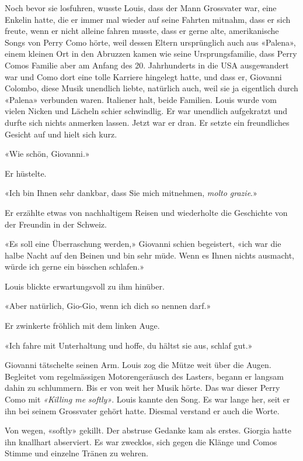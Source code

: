Noch bevor sie losfuhren, wusste Louis, dass der Mann Grossvater war,
eine Enkelin hatte, die er immer mal wieder auf seine Fahrten mitnahm,
dass er sich freute, wenn er nicht alleine fahren musste, dass er gerne
alte, amerikanische Songs von Perry Como hörte, weil dessen Eltern
ursprünglich auch aus «Palena», einem kleinen Ort in den Abruzzen kamen wie
seine Ursprungsfamilie, dass Perry Comos Familie aber am Anfang des 20.
Jahrhunderts in die USA ausgewandert war und Como dort eine tolle
Karriere hingelegt hatte, und dass er, Giovanni Colombo, diese Musik
unendlich liebte, natürlich auch, weil sie ja eigentlich durch «Palena»
verbunden waren. Italiener halt, beide Familien.
Louis wurde vom vielen Nicken und Lächeln schier schwindlig. Er war
unendlich aufgekratzt und durfte
sich nichts anmerken lassen. Jetzt war er dran. Er setzte ein freundliches Gesicht auf und hielt sich
kurz. 

«Wie schön, Giovanni.»

Er hüstelte.

«Ich bin Ihnen sehr dankbar, dass Sie mich mitnehmen, \emph{molto
grazie}.»

Er erzählte etwas von nachhaltigem Reisen und wiederholte die
Geschichte von der Freundin in der Schweiz.

«Es soll eine Überraschung werden,» Giovanni schien begeistert, «ich war
die halbe Nacht auf den Beinen und bin sehr müde. Wenn es Ihnen nichts
ausmacht, würde ich gerne ein bisschen schlafen.»

Louis blickte erwartungsvoll zu ihm hinüber.

«Aber natürlich, Gio-Gio, wenn ich dich so nennen darf.»

Er zwinkerte fröhlich mit dem linken Auge.

«Ich fahre mit Unterhaltung und hoffe, du hältst sie aus, schlaf gut.»

Giovanni tätschelte seinen Arm. Louis zog die Mütze weit über die 
Augen. Begleitet vom regelmässigen Motorengeräusch des Lasters, begann
er langsam dahin zu schlummern. Bis er von weit her Musik hörte.
Das war dieser Perry Como mit \emph{«Killing me softly»}. Louis kannte
den Song.  Es war lange her, seit er ihn bei seinem Grossvater gehört hatte. Diesmal verstand er auch die Worte.


Von wegen, «softly» gekillt. Der abstruse Gedanke kam als erstes.
Giorgia hatte ihn knallhart abserviert. Es war zwecklos, sich gegen die Klänge und Comos Stimme und einzelne Tränen zu wehren. 

